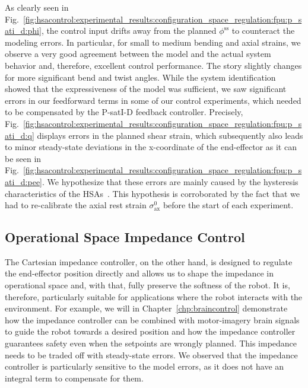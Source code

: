 As clearly seen in Fig.~\ref{fig:hsacontrol:experimental_results:configuration_space_regulation:fpu:p_sati_d:phi}, the control input drifts away from the planned $\phi^\mathrm{ss}$ to counteract the modeling errors.
In particular, for small to medium bending and axial strains, we observe a very good agreement between the model and the actual system behavior and, therefore, excellent control performance. 
The story slightly changes for more significant bend and twist angles. While the system identification showed that the expressiveness of the model was sufficient, we saw significant errors in our feedforward terms in some of our control experiments, which needed to be compensated by the P-satI-D feedback controller. Precisely, Fig.~\ref{fig:hsacontrol:experimental_results:configuration_space_regulation:fpu:p_sati_d:q} displays errors in the planned shear strain, which subsequently also leads to minor steady-state deviations in the x-coordinate of the end-effector as it can be seen in Fig.~\ref{fig:hsacontrol:experimental_results:configuration_space_regulation:fpu:p_sati_d:pee}. We hypothesize that these errors are mainly caused by the hysteresis characteristics of the \glspl{HSA}~\citep{good2022expanding}. This hypothesis is corroborated by the fact that we had to re-calibrate the axial rest strain $\sigma_\mathrm{ax}^0$ before the start of each experiment.

\subsection{Operational Space Impedance Control}
The Cartesian impedance controller, on the other hand, is designed to regulate the end-effector position directly and allows us to shape the impedance in operational space and, with that, fully preserve the softness of the robot.
It is, therefore, particularly suitable for applications where the robot interacts with the environment. For example, we will in Chapter~\ref{chp:braincontrol} demonstrate how the impedance controller can be combined with motor-imagery brain signals to guide the robot towards a desired position and how the impedance controller guarantees safety even when the setpoints are wrongly planned.
This impedance needs to be traded off with steady-state errors. We observed that the impedance controller is particularly sensitive to the model errors, as it does not have an integral term to compensate for them.
